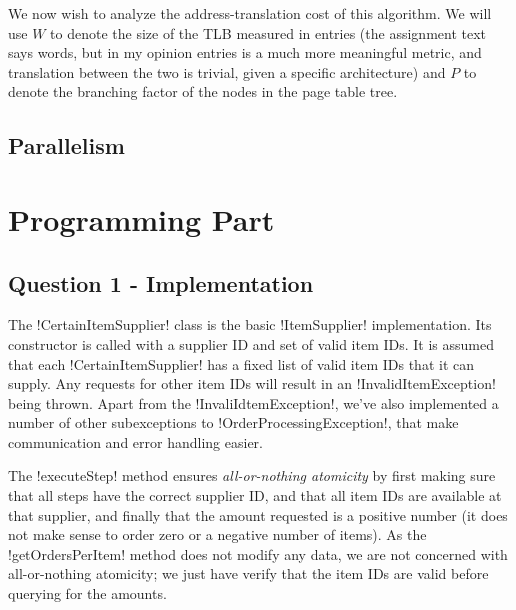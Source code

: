\documentclass[a4paper, 12pt]{article}
\begin{document}

We now wish to analyze the address-translation cost of this
algorithm. We will use $W$ to denote the size of the TLB measured in
entries (the assignment text says words, but in my opinion entries is
a much more meaningful metric, and translation between the two is
trivial, given a specific architecture) and $P$ to denote the
branching factor of the nodes in the page table tree.

\subsection*{Parallelism}

\section*{Programming Part}

\subsection*{Question 1 - Implementation}




The !CertainItemSupplier! class is the basic !ItemSupplier!
implementation. Its constructor is called with a supplier ID and set
of valid item IDs. It is assumed that each !CertainItemSupplier! has a
fixed list of valid item IDs that it can supply. Any requests for
other item IDs will result in an !InvalidItemException! being
thrown. Apart from the !InvaliIdtemException!, we've also implemented
a number of other subexceptions to !OrderProcessingException!, that
make communication and error handling easier.

The !executeStep! method ensures \emph{all-or-nothing atomicity} by
first making sure that all steps have the correct supplier ID, and
that all item IDs are available at that supplier, and finally that the
amount requested is a positive number (it does not make sense to order
zero or a negative number of items). As the !getOrdersPerItem! method
does not modify any data, we are not concerned with all-or-nothing
atomicity; we just have verify that the item IDs are valid before
querying for the amounts.
\end{document}
